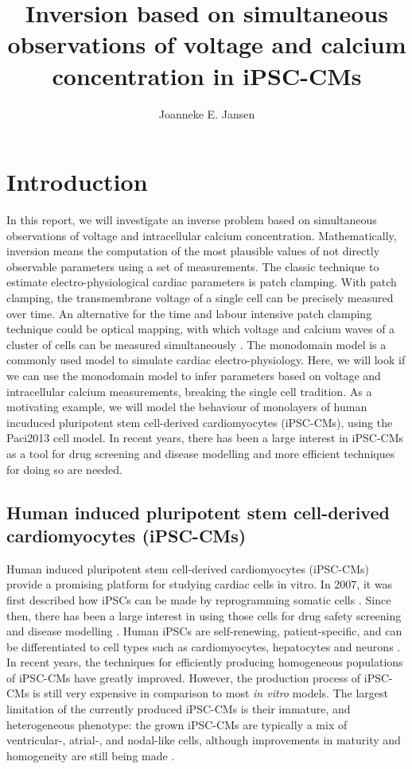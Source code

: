 \documentclass[12pt,a4paper]{article}
\title{Inversion based on simultaneous observations of voltage and calcium concentration in iPSC-CMs}
\author{Joanneke E. Jansen}
\begin{document}
%
\maketitle
%
\section{Introduction} \label{Introduction}
In this report, we will investigate an inverse problem based on simultaneous observations of voltage and intracellular calcium concentration. Mathematically, inversion means the computation of the most plausible values of not directly observable parameters using a set of measurements. The classic technique to estimate electro-physiological cardiac parameters is patch clamping. With patch clamping, the transmembrane voltage of a single cell can be precisely measured over time. An alternative for the time and labour intensive patch clamping technique could be optical mapping, with which voltage and calcium waves of a cluster of cells can be measured simultaneously \cite{Lee2012}. The monodomain model is a commonly used model to simulate cardiac electro-physiology. Here, we will look if we can use the monodomain model to infer parameters based on voltage and intracellular calcium measurements, breaking the single cell tradition. As a motivating example, we will model the behaviour of monolayers of human incuduced pluripotent stem cell-derived cardiomyocytes (iPSC-CMs), using the Paci2013 cell model. In recent years, there has been a large interest in iPSC-CMs as a tool for drug screening and disease modelling and more efficient techniques for doing so are needed.
%
\subsection{Human induced pluripotent stem cell-derived cardiomyocytes (iPSC-CMs)}
Human induced pluripotent stem cell-derived cardiomyocytes (iPSC-CMs) provide a promising platform for studying cardiac cells in vitro. In 2007, it was first described how iPSCs can be made by reprogramming somatic cells \cite{Takahashi2007}. Since then, there has been a large interest in using those cells for drug safety screening and disease modelling \cite{Sallam2016}. Human iPSCs are self-renewing, patient-specific, and can be differentiated to cell types such as cardiomyocytes, hepatocytes and neurons \cite{Rajamohan2013}. In recent years, the techniques for efficiently producing homogeneous populations of iPSC-CMs  have greatly improved. However, the production process of iPSC-CMs is still very expensive in comparison to most \textit{in vitro} models. The largest limitation of the currently produced iPSC-CMs is their immature, and heterogeneous phenotype: the grown iPSC-CMs are typically a mix of ventricular-, atrial-, and nodal-like cells, although improvements in maturity and homogeneity are still being made \cite{Denning2016}. 
%
\end{document}
